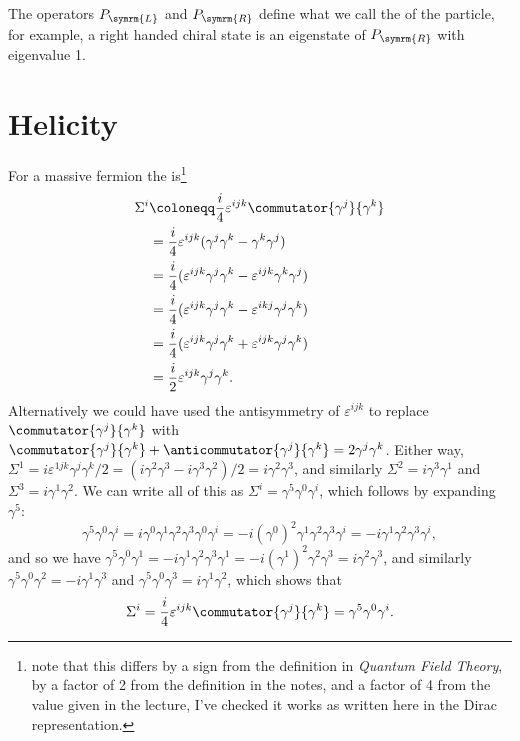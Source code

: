 \documentclass[fleqn]{NotesClass}
\newcommand*{\course}[1]{\textit{#1}}
\newcommand{\Left}{\symrm{L}}
\newcommand{\Right}{\symrm{R}}
\begin{document}
    The operators \(P_{\Left}\) and \(P_{\Right}\) define what we call the  of the particle, for example, a right handed chiral state is an eigenstate of \(P_{\Right}\) with eigenvalue 1.
    
    \section{Helicity}
    For a massive fermion the  is\footnote{note that this differs by a sign from the definition in \course{Quantum Field Theory}, by a factor of 2 from the definition in the notes, and a factor of 4 from the value given in the lecture, I've checked it works as written here in the Dirac representation.}
    \begin{align}
        \Sigma^i &\coloneqq \frac{i}{4}\varepsilon^{ijk}\commutator{\gamma^j}{\gamma^k}\\
        &= \frac{i}{4}\varepsilon^{ijk}(\gamma^j\gamma^k - \gamma^k\gamma^j)\\
        &= \frac{i}{4}(\varepsilon^{ijk}\gamma^j\gamma^k - \varepsilon^{ijk}\gamma^k\gamma^j)\\
        &= \frac{i}{4}(\varepsilon^{ijk}\gamma^j\gamma^k - \varepsilon^{ikj}\gamma^j\gamma^k)\\
        &= \frac{i}{4}(\varepsilon^{ijk}\gamma^j\gamma^k + \varepsilon^{ijk}\gamma^j\gamma^k)\\
        &= \frac{i}{2}\varepsilon^{ijk}\gamma^j\gamma^k.
    \end{align}
    Alternatively we could have used the antisymmetry of \(\varepsilon^{ijk}\) to replace \(\commutator{\gamma^j}{\gamma^k}\) with \(\commutator{\gamma^j}{\gamma^k} + \anticommutator{\gamma^j}{\gamma^k} = 2\gamma^j\gamma^k\).
    Either way, \(\Sigma^1 = i\varepsilon^{1jk}\gamma^j\gamma^k/2 = (i\gamma^2\gamma^3 - i\gamma^3\gamma^2)/2 = i\gamma^2\gamma^3\), and similarly \(\Sigma^2 = i\gamma^3\gamma^1\) and \(\Sigma^3 = i\gamma^1\gamma^2\).
    We can write all of this as \(\Sigma^i = \gamma^5\gamma^0\gamma^i\), which follows by expanding \(\gamma^5\):
    \begin{equation}
        \gamma^5\gamma^0\gamma^i = i\gamma^0\gamma^1\gamma^2\gamma^3\gamma^0\gamma^i = -i(\gamma^0)^2\gamma^1\gamma^2\gamma^3\gamma^i = -i\gamma^1\gamma^2\gamma^3\gamma^i,
    \end{equation}
    and so we have \(\gamma^5\gamma^0\gamma^1 = -i\gamma^1\gamma^2\gamma^3\gamma^1 = -i(\gamma^1)^2\gamma^2\gamma^3 = i\gamma^2\gamma^3\), and similarly \(\gamma^5\gamma^0\gamma^2 = -i\gamma^1\gamma^3\) and \(\gamma^5\gamma^0\gamma^3 = i\gamma^1\gamma^2\), which shows that
    \begin{equation}
        \Sigma^i = \frac{i}{4}\varepsilon^{ijk}\commutator{\gamma^j}{\gamma^k} = \gamma^5\gamma^0\gamma^i.
    \end{equation}
    
\end{document}
